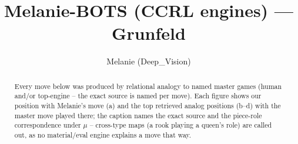 \documentclass[11pt]{article}
\title{Melanie-BOTS (CCRL engines) — Grunfeld}
\author{Melanie (Deep\_Vision)}
\date{}
\begin{document}
\maketitle

\begin{abstract}Every move below was produced by relational analogy to named master games (human and/or top-engine -- the exact source is named per move). Each figure shows our position with Melanie's move (a) and the top retrieved analog positions (b--d) with the master move played there; the caption names the exact source and the piece-role correspondence under $\mu$ -- cross-type maps (a rook playing a queen's role) are called out, as no material/eval engine explains a move that way.\end{abstract}

\begin{figure}[p]\centering
\begin{subfigure}{0.46\textwidth}\centering
\resizebox{\linewidth}{!}{%
\newchessgame
\chessboard[
  setfen={rnbqk2r/ppp1ppbp/6p1/6B1/3PP3/2P5/P4PPP/R2QKBNR b KQkq - 2 7},
  showmover=false,
  pgfstyle=straightmove, color=movearrow, markmove={e8-g8}
]}
\caption{}
\end{subfigure}\hfill
\begin{subfigure}{0.46\textwidth}\centering
\resizebox{\linewidth}{!}{%
\newchessgame
\chessboard[
  setfen={rnbqk2r/pp2ppbp/2p3p1/8/B2PP3/2P5/P4PPP/R1BQK1NR b KQkq - 1 8},
  showmover=false,
  pgfstyle=straightmove, color=movearrow, markmove={e8-g8}
]}
\caption{}
\end{subfigure}
\\[4pt]
\begin{subfigure}{0.46\textwidth}\centering
\resizebox{\linewidth}{!}{%
\newchessgame
\chessboard[
  setfen={rnbqk2r/pp2ppbp/2p3p1/8/B2PP3/2P5/P4PPP/R1BQK1NR b KQkq - 1 8},
  showmover=false,
  pgfstyle=straightmove, color=movearrow, markmove={e8-g8}
]}
\caption{}
\end{subfigure}\hfill
\begin{subfigure}{0.46\textwidth}\centering
\resizebox{\linewidth}{!}{%
\newchessgame
\chessboard[
  setfen={rnbqk2r/pp2ppbp/2p3p1/8/B2PP3/2P5/P4PPP/R1BQK1NR b KQkq - 1 8},
  showmover=false,
  pgfstyle=straightmove, color=movearrow, markmove={e8-g8}
]}
\caption{}
\end{subfigure}

\end{figure}
\end{document}
